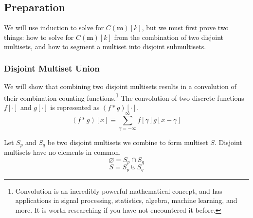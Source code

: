 \documentclass{article}
\begin{document}
\subsection{Preparation}

 We will use induction to solve for $C(\bm{m})[k]$, but we must first prove two things: how to solve for $C(\bm{m})[k]$ from the combination of two disjoint multisets, and how to segment a multiset into disjoint submultisets.



\subsubsection{Disjoint Multiset Union} \label{union}

We will show that combining two disjoint multisets results in a convolution of their combination counting functions.\footnote{Convolution is an incredibly powerful mathematical concept, and has applications in signal processing, statistics, algebra, machine learning, and more. It is worth researching if you have not encountered it before.} The convolution of two discrete functions $f[\cdot]$ and $g[\cdot]$ is represented as $(f * g)[\cdot]$.
\begin{equation}
     (f * g)[x] \equiv \sum_{\gamma=-\infty}^{\infty} f[\gamma]g[x - \gamma]
\end{equation}

Let $S_p$ and $S_q$ be two disjoint multisets we combine to form multiset $S$. Disjoint multisets have no elements in common. 
\begin{equation}
    \varnothing = S_p \cap S_q
\end{equation}
\begin{equation}
    S = S_p \uplus S_q
\end{equation}
\end{document}
